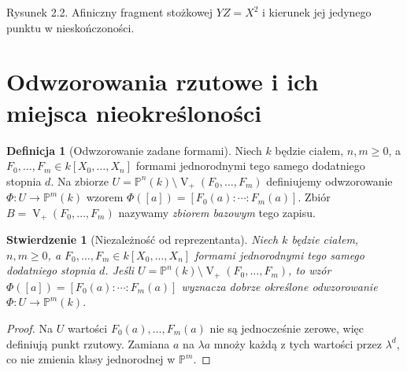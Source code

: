 \documentclass[11pt,a4paper,openany]{report}
\numberwithin{equation}{section}
\theoremstyle{plain}
\newtheorem{stwierdzenie}[twierdzenie]{Stwierdzenie}
\theoremstyle{definition}
\newtheorem{definicja}[twierdzenie]{Definicja}
\theoremstyle{remark}
\newcommand{\PP}{\mathbb P}
\newcommand{\V}{\operatorname V}
\begin{document}
\begin{center}

\small Rysunek 2.2. Afiniczny fragment stożkowej $YZ=X^2$ i kierunek
jej jedynego punktu w nieskończoności.
\end{center}

\section{Odwzorowania rzutowe i ich miejsca nieokreśloności}

\begin{definicja}[Odwzorowanie zadane formami]
Niech $k$ będzie ciałem, $n,m\ge0$, a
$F_0,\dots,F_m\in k[X_0,\dots,X_n]$ formami jednorodnymi tego samego dodatniego stopnia $d$.
Na zbiorze $U=\PP^n(k)\setminus\V_+(F_0,\dots,F_m)$
definiujemy odwzorowanie
$\Phi:U\to\PP^m(k)$ wzorem
$\Phi([a])=[F_0(a):\cdots:F_m(a)]$.
Zbiór $B=\V_+(F_0,\dots,F_m)$ nazywamy
\emph{zbiorem bazowym} tego zapisu.
\end{definicja}

\begin{stwierdzenie}[Niezależność od reprezentanta]
Niech $k$ będzie ciałem, $n,m\ge0$, a
$F_0,\ldots,F_m\in k[X_0,\ldots,X_n]$
formami jednorodnymi tego samego dodatniego stopnia $d$.
Jeśli $U=\PP^n(k)\setminus\V_+(F_0,\ldots,F_m)$, to wzór
$\Phi([a])=[F_0(a):\cdots:F_m(a)]$ wyznacza dobrze określone
odwzorowanie $\Phi:U\to\PP^m(k)$.
\end{stwierdzenie}
\begin{proof}
Na $U$ wartości $F_0(a),\dots,F_m(a)$ nie są jednocześnie
zerowe, więc definiują punkt rzutowy. Zamiana $a$ na
$\lambda a$ mnoży każdą z tych wartości przez $\lambda^d$,
co nie zmienia klasy jednorodnej w $\PP^m$.
\end{proof}
\end{document}
